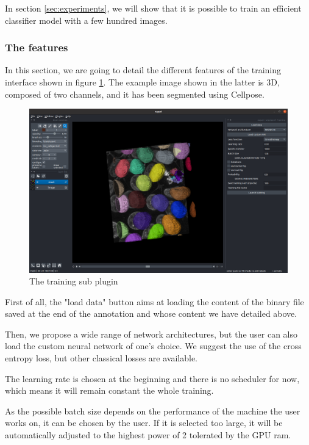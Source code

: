 \documentclass{article}
\begin{document}
In section \ref{sec:experiments}, we will show that it is possible to train an efficient classifier model with a few hundred images.

\subsubsection{The features}

In this section, we are going to detail the different features of the training interface shown in figure \ref{training}. The example image shown in the latter is 3D, composed of two channels, and it has been segmented using Cellpose\cite{stringer2021cellpose}.
\begin{figure}[htp!]{}
 \centering
 \includegraphics[scale=0.15]{Figures/training.png}
  \caption{The training sub plugin}
  \label{training}

\end{figure}


First of all, the "load data" button aims at loading the content of the binary file saved at the end of the annotation and whose content we have detailed above.

Then, we propose a wide range of network architectures, but the user can also load the custom neural network of one's choice. We suggest the use of the cross entropy loss, but other classical losses are available. 

The learning rate is chosen at the beginning and there is no scheduler for now, which means it will remain constant the whole training. 

As the possible batch size depends on the performance of the machine the user works on, it can be chosen by the user. If it is selected too large, it will be automatically adjusted to the highest power of 2 tolerated by the GPU ram.
\end{document}
